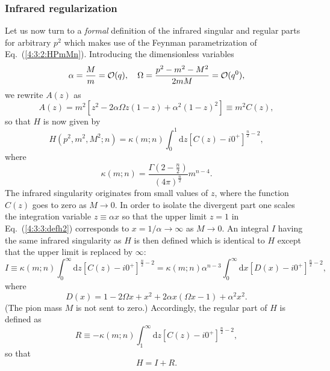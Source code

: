 \documentclass[twoside,12pt]{article}
\begin{document}
\subsubsection{Infrared regularization}
   Let us now turn to a {\em formal} definition of the infrared singular
and regular parts for arbitrary $p^2$ \cite{Becher:1999he} which makes use of the Feynman
parametrization of Eq.\ (\ref{4:3:2:HPmMn}).
   Introducing the dimensionless variables
\begin{equation}
\label{4:3:3:alphaomegadef}
\alpha=\frac{M}{m}={\cal O}(q),\quad \Omega=\frac{p^2-m^2-M^2}{2m M}={\cal O}(q^0),
\end{equation}
we rewrite $A(z)$ as
\begin{displaymath}
A(z)=m^2[z^2-2\alpha\Omega z(1-z)+\alpha^2(1-z)^2]\equiv m^2 C(z),
\end{displaymath}
so that $H$ is now given by
\begin{equation}
\label{4:3:3:defh2}
H(p^2,m^2,M^2;n)=\kappa(m;n) \int_0^1 \mbox{d}z
[C(z)-i0^+]^{\frac{n}{2}-2},
\end{equation}
where
\begin{equation}
\label{4:3:3:kappan}
\kappa(m;n)
=\frac{\Gamma\left(2-\frac{n}{2}\right)}{(4\pi)^{\frac{n}{2}}}m^{n-4}.
\end{equation}
   The infrared singularity originates from small values of $z$, where
the function $C(z)$ goes to zero as $M\to 0$.
   In order to isolate the divergent part one scales the integration variable
$z\equiv \alpha x$ so that the upper limit $z=1$ in Eq.\ (\ref{4:3:3:defh2})
corresponds to $x=1/\alpha\to
\infty$ as $M\to 0$.
   An integral $I$ having the same infrared singularity as $H$ is then
defined which is identical to $H$ except that the upper limit is
replaced by $\infty$:
\begin{equation}
\label{4:3:3:Idef}
I\equiv\kappa(m;n)\int_0^\infty \mbox{d}z[C(z)-i0^+]^{\frac{n}{2}-2}
=\kappa(m;n) \alpha^{n-3}\int_0^\infty \mbox{d}x[D(x)-i0^+]^{\frac{n}{2}-2},
\end{equation}
where
\begin{displaymath}
D(x)=1-2\Omega x+x^2+2\alpha x(\Omega x-1)+\alpha^2 x^2.
\end{displaymath}
   (The pion mass $M$ is not sent to zero.)
   Accordingly, the regular part of $H$ is defined as
\begin{equation}
\label{4:3:3:Rdef}
R\equiv-\kappa (m;n)\int_1^\infty \mbox{d}z [C(z)-i0^+]^{\frac{n}{2}-2},
\end{equation}
so that
\begin{equation}
\label{4:3:3:hir}
H=I+R.
\end{equation}
\end{document}
